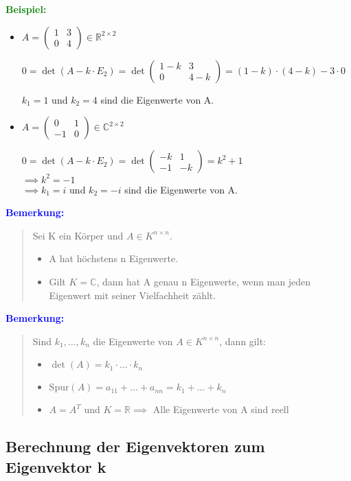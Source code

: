 \documentclass{article}
\newcommand{\blue}[1]{\textcolor{blue}{#1}}
\newcommand{\green}[1]{\textcolor{green}{#1}}
\newcommand{\ex}{\green{\textbf{Beispiel: }}}
\newcommand{\an}[1]{\blue{\textbf{Bemerkung: }}\begin{quote}#1\end{quote}}
\newcommand{\R}{\mathbb{R}}
\newcommand{\C}{\mathbb{C}}
\newcommand{\tr}{\text{Spur}}
\begin{document}
\ex \begin{itemize}
    \item $A = \begin{pmatrix}
        1 & 3\\
        0 & 4
    \end{pmatrix} \in \R^{2 \times 2}$

    $0 = \det(A - k \cdot E_2) = \det \begin{pmatrix}
        1 - k & 3\\
        0 & 4-k
    \end{pmatrix} = (1-k) \cdot (4-k) -3 \cdot 0$

    $k_1 = 1$ und $k_2 = 4$ sind die Eigenwerte von A.
    \item $A = \begin{pmatrix}
        0 & 1\\
        -1 & 0
    \end{pmatrix} \in \C^{2 \times 2}$

    $0 = \det(A - k \cdot E_2) = \det \begin{pmatrix}
        -k & 1\\
        -1 & -k
    \end{pmatrix} = k^2 + 1$\\
    $\implies k^2 = -1$\\
    $\implies k_1 = i$ und $k_2 = -i$ sind die Eigenwerte von A.
\end{itemize}

\an{
    Sei K ein Körper und $A \in K^{n \times n}$.
    \begin{itemize}
        \item A hat höchstens n Eigenwerte.
        \item Gilt $K = \C$, dann hat A genau n Eigenwerte, wenn man jeden Eigenwert mit seiner Vielfachheit zählt.
    \end{itemize}
}

\an{
    Sind $k_1, \dots, k_n$ die Eigenwerte von $A \in K^{n \times n}$, dann gilt:
    \begin{itemize}
        \item $\det(A) = k_1 \cdot \dots \cdot k_n$
        \item $\tr(A) = a_{11} + \dots + a_{nn} = k_1 + \dots + k_n$
        \item $A = A^T$ und $K = \R \implies$ Alle Eigenwerte von A sind reell
    \end{itemize}
}

\newpage
\subsection{Berechnung der Eigenvektoren zum Eigenvektor k}
\end{document}
